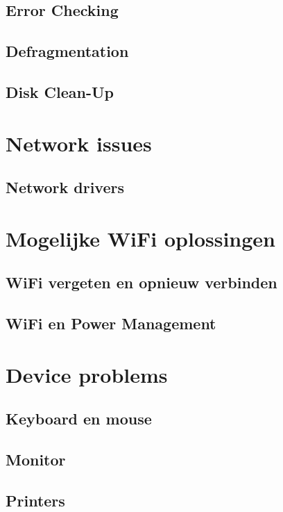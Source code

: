 \documentclass[a4paper,12pt,twoside,titlepage]{article}
\begin{document}
\subsection{Error Checking}

\subsection{Defragmentation}

\subsection{Disk Clean-Up}


\section{Network issues}

\subsection{Network drivers}


\section{Mogelijke WiFi oplossingen}

\subsection{WiFi vergeten en opnieuw verbinden}


\subsection{WiFi en Power Management}


\section{Device problems}
\subsection{Keyboard en mouse}
\subsection{Monitor}
\subsection{Printers}
\end{document}
